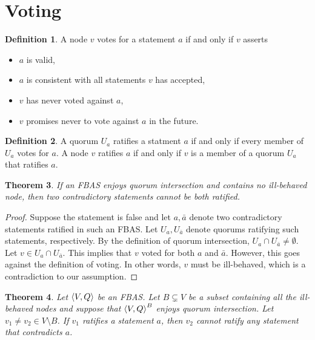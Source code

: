 \documentclass[12pt, psamsfonts]{amsart}
\newtheorem{thm}{Theorem}[section]
\theoremstyle{definition}
\newtheorem{defn}[thm]{Definition}
\theoremstyle{remark}
\numberwithin{equation}{section}
\begin{document}
\section{Voting}

\begin{defn}
    A node $v$ votes for a statement $a$ if and only if $v$ asserts
    \begin{itemize}
        \item
            $a$ is valid,
        \item
            $a$ is consistent with all statements $v$ has accepted,
        \item
            $v$ has never voted against $a$,
        \item
            $v$ promises never to vote against $a$ in the future.
    \end{itemize}
\end{defn}

\begin{defn}
    A quorum $U_a$ ratifies a statment $a$ if and only if every member of $U_a$ votes for $a$.
    A node $v$ ratifies $a$ if and only if $v$ is a member of a quorum $U_a$ that ratifies $a$.
\end{defn}

\begin{thm}
    If an FBAS enjoys quorum intersection and contains no ill-behaved node, then two contradictory statements cannot be both ratified.
\end{thm}

\begin{proof}
    Suppose the statement is false and let $a, \bar{a}$ denote two contradictory statements ratified in such an FBAS.
    Let $U_a, U_{\bar{a}}$ denote quorums ratifying such statements, respectively.
    By the definition of quorum intersection, $U_a \cap U_{\bar{a}} \ne \emptyset$.
    Let $v \in U_a \cap U_{\bar{a}}$.
    This implies that $v$ voted for both $a$ and $\bar{a}$.
    However, this goes against the definition of voting.
    In other words, $v$ must be ill-behaved, which is a contradiction to our assumption.
\end{proof}

\begin{thm}\label{ill_behaved_ratify}
    Let $\ev{V, Q}$ be an FBAS.
    Let $B \subsetneq V$ be a subset containing all the ill-behaved nodes and suppose that $\ev{V, Q}^B$ enjoys quorum intersection.
    Let $v_1 \ne v_2 \in V \setminus B$.
    If $v_1$ ratifies a statement $a$, then $v_2$ cannot ratify any statement that contradicts $a$.
\end{thm}
\end{document}
